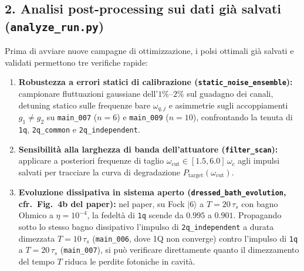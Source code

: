\documentclass[11pt,a4paper]{article}
\begin{document}
\subsection*{2. Analisi post-processing sui dati già salvati (\texttt{analyze\_run.py})}
Prima di avviare nuove campagne di ottimizzazione, i polsi ottimali già salvati e validati permettono tre verifiche rapide:
\begin{enumerate}
    \item \textbf{Robustezza a errori statici di calibrazione (\texttt{static\_noise\_ensemble}):} campionare fluttuazioni gaussiane dell'$1\%\text{--}2\%$ sul guadagno dei canali, detuning statico sulle frequenze bare $\omega_{q,j}$ e asimmetrie sugli accoppiamenti $g_1 \neq g_2$ su \texttt{main\_007} ($n=6$) e \texttt{main\_009} ($n=10$), confrontando la tenuta di \texttt{1q}, \texttt{2q\_common} e \texttt{2q\_independent}.
    \item \textbf{Sensibilità alla larghezza di banda dell'attuatore (\texttt{filter\_scan}):} applicare a posteriori frequenze di taglio $\omega_{\text{cut}} \in [1.5, 6.0]\,\omega_c$ agli impulsi salvati per tracciare la curva di degradazione $P_{\text{target}}(\omega_{\text{cut}})$.
    \item \textbf{Evoluzione dissipativa in sistema aperto (\texttt{dressed\_bath\_evolution}, cfr.\ Fig.~4b del paper):} nel paper, su Fock $|6\rangle$ a $T=20\,\tau_s$ con bagno Ohmico a $\eta = 10^{-4}$, la fedeltà di \texttt{1q} scende da $0.995$ a $0.901$. Propagando sotto lo stesso bagno dissipativo l'impulso di \texttt{2q\_independent} a durata dimezzata $T=10\,\tau_s$ (\texttt{main\_006}, dove 1Q non converge) contro l'impulso di \texttt{1q} a $T=20\,\tau_s$ (\texttt{main\_007}), si può verificare direttamente quanto il dimezzamento del tempo $T$ riduca le perdite fotoniche in cavità.
\end{enumerate}
\end{document}
